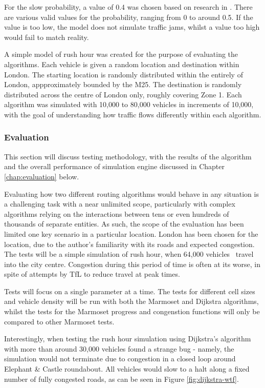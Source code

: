 \documentclass[ %
                    author={Alexander Hill},
                supervisor={Dr. Benjamin Sach},
                    degree={MEng},
                     title={MARMOSET},
                  subtitle={Multi-Agent Route Management using Online Simulation for Efficient Transportation},
                      type={research},
                      year={2016} ]{dissertation}
\begin{document}
For the slow probability, a value of 0.4 was chosen based on research in
\cite{nagel-detail}. There are various valid values for the probability, ranging
from 0 to around 0.5. If the value is too low, the model does not simulate
traffic jams, whilst a value too high would fail to match reality.

A simple model of rush hour was created for the purpose of evaluating the
algorithms. Each vehicle is given a random location and destination within
London. The starting location is randomly distributed within the entirely of
London, appproximately bounded by the M25. The destination is randomly
distributed across the centre of London only, roughly covering Zone 1. Each
algorithm was simulated with 10,000 to 80,000 vehicles in increments of 10,000,
with the goal of understanding how traffic flows differently within each
algorithm.

\subsubsection{Evaluation}

This section will discuss testing methodology, with the results of the algorithm
and the overall performance of simulation engine discussed in Chapter
\ref{chap:evaluation} below.

Evaluating how two different routing algorithms would behave in any situation is
a challenging task with a near unlimited scope, particularly with complex
algorithms relying on the interactions between tens or even hundreds of
thousands of separate entities. As such, the scope of the evaluation has been
limited one key scenario in a particular location. London has been chosen for
the location, due to the author's familiarity with its roads and expected
congestion. The tests will be a simple simulation of rush hour, when 64,000
vehicles~\cite{tfl} travel into the city centre.  Congestion during this period
of time is often at its worse, in spite of attempts by TfL to reduce travel at
peak times.

Tests will focus on a single parameter at a time. The tests for different cell
sizes and vehicle density will be run with both the Marmoset and Dijkstra
algorithms, whilst the tests for the Marmoset progress and congenstion functions
will only be compared to other Marmoset tests.

Interestingly, when testing the rush hour simulation using Dijkstra's algorithm
with more than around 30,000 vehicles found a strange bug - namely, the
simulation would not terminate due to congestion in a closed loop around
Elephant \& Castle roundabout. All vehicles would slow to a halt along a fixed
number of fully congested roads, as can be seen in Figure \ref{fig:dijkstra-wtf}.
\end{document}

